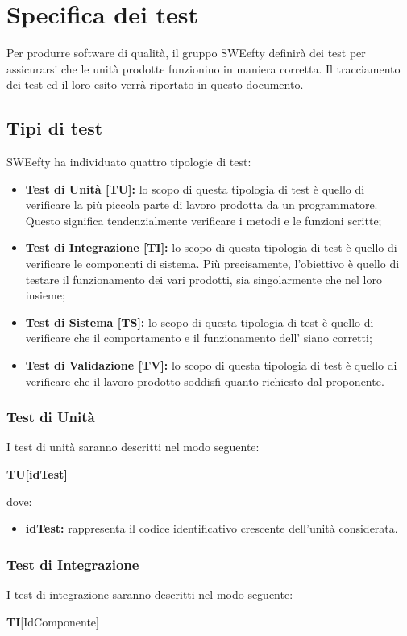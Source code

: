 \section{Specifica dei test}
Per produrre software di qualità, il gruppo SWEefty definirà dei test per assicurarsi che le unità prodotte funzionino in maniera corretta. Il tracciamento dei test ed il loro esito verrà riportato in questo documento.
	\subsection{Tipi di test}
	SWEefty ha individuato quattro tipologie di test:
	\begin{itemize}
		\item {\textbf{Test di Unità [TU]:} lo scopo di questa tipologia di test è quello di verificare la più piccola parte di lavoro prodotta da un programmatore. Questo significa tendenzialmente verificare i metodi e le funzioni scritte; }
		\item {\textbf{Test di Integrazione [TI]:} lo scopo di questa tipologia di test è quello di verificare le componenti di sistema. Più	precisamente, l’obiettivo è quello di testare il funzionamento dei vari  prodotti, sia singolarmente che nel loro insieme; }
		\item {\textbf{Test di Sistema [TS]:} lo scopo di questa tipologia di test è quello di verificare che il comportamento e il funzionamento dell’ siano corretti;}
		\item {\textbf{Test di Validazione [TV]:} lo scopo di questa tipologia di test è quello di verificare che il lavoro prodotto soddisfi quanto richiesto dal proponente. }
	\end{itemize} 
		
	\subsubsection{Test di Unità}
	I test di unità saranno descritti nel modo seguente: \Spazio

	\centerline{\textbf{TU[idTest]}}
	
	dove:
	\begin{itemize}
		\item \textbf{idTest:} rappresenta il codice identificativo crescente dell’unità considerata.
	\end{itemize}
	
	\subsubsection{Test di Integrazione}
	I test di integrazione saranno descritti nel modo seguente: \Spazio
	\centerline{\textbf{TI}[IdComponente]}
	
